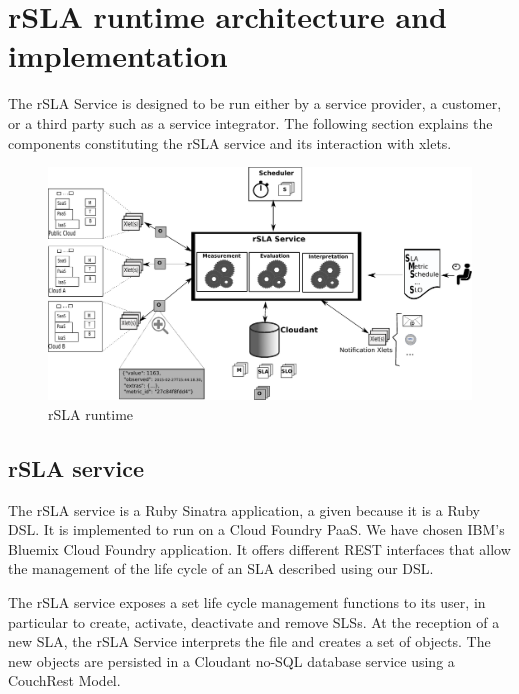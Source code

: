 \section{rSLA runtime architecture and implementation }

The rSLA Service is designed to be run either by a service provider, a customer, or a third party such as a service integrator.  The following section  explains the components constituting the rSLA service and its interaction with xlets.  

\begin{figure}[htb]
\centering
\includegraphics[width=\textwidth]{pics/runtime.pdf}
\caption{\label{fig:runtime} rSLA runtime}
\end{figure}


\subsection{rSLA service}
The rSLA service is a Ruby Sinatra application, a given because it is a Ruby DSL. It is implemented to run on a Cloud Foundry PaaS. We have chosen IBM's Bluemix Cloud Foundry application. It offers different REST interfaces that allow the management of the life cycle of an SLA described using our DSL.

The rSLA service exposes a set life cycle management functions to its user, in particular to create, activate, deactivate and remove SLSs. At the reception of a new SLA, the rSLA Service interprets the file and creates a set of objects. The new objects are persisted in a Cloudant no-SQL database service using a CouchRest Model.

